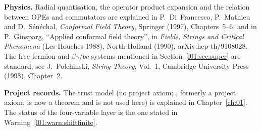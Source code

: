 \textbf{Physics.} Radial quantisation, the operator product expansion and the relation between OPEs and commutators
are explained in P.~Di~Francesco, P.~Mathieu and D.~S\'en\'echal, \emph{Conformal Field Theory}, Springer (1997),
Chapters~5--6, and in P.~Ginsparg, ``Applied conformal field theory'', in \emph{Fields, Strings and Critical Phenomena}
(Les Houches 1988), North-Holland (1990), arXiv:hep-th/9108028. The free-fermion and $\beta\gamma$/$bc$ systems mentioned in
Section~\ref{l01:sec:super} are standard; see J.~Polchinski, \emph{String Theory}, Vol.~1, Cambridge University Press (1998),
Chapter~2.

\textbf{Project records.} The trust model (no project axiom;
, formerly a project axiom, is now a theorem and is not used here) is explained in
Chapter~\ref{ch:01}. The status of the four-variable layer is the one stated in Warning~\ref{l01:warn:shiftfinite}.

\endgroup
